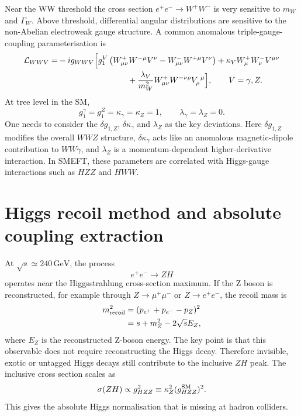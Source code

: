 \documentclass[11pt,a4paper]{report}
\newcommand{\ee}{e^+e^-}
\newcommand{\GeV}{\,\mathrm{GeV}}
\begin{document}
Near the WW threshold the cross section $\ee\to W^+W^-$ is very sensitive to $m_W$ and $\Gamma_W$.  Above threshold, differential angular distributions are sensitive to the non-Abelian electroweak gauge structure.  A common anomalous triple-gauge-coupling parameterisation is
\begin{align}
  \mathcal L_{WWV}=&-i g_{WWV}\Big[
  g_1^V\left(W^+_{\mu\nu}W^{-\mu}V^\nu-W^-_{\mu\nu}W^{+\mu}V^\nu\right)
  +\kappa_V W^+_\mu W^-_\nu V^{\mu\nu} \\
  &\hspace{3.0cm}
  +\frac{\lambda_V}{m_W^2}W^+_{\mu\nu}W^{-\nu\rho}V_{\rho}^{\ \mu}\Big],
  \qquad V=\gamma,Z.
\end{align}
At tree level in the SM,
\begin{equation}
  g_1^\gamma=g_1^Z=\kappa_\gamma=\kappa_Z=1,
  \qquad
  \lambda_\gamma=\lambda_Z=0.
\end{equation}
One needs to consider the $\delta g_{1,Z}$, $\delta\kappa_\gamma$ and $\lambda_Z$ as the key deviations.  Here $\delta g_{1,Z}$ modifies the overall $WWZ$ structure, $\delta\kappa_\gamma$ acts like an anomalous magnetic-dipole contribution to $WW\gamma$, and $\lambda_Z$ is a momentum-dependent higher-derivative interaction.  In SMEFT, these parameters are correlated with Higgs-gauge interactions such as $HZZ$ and $HWW$.


\section{Higgs recoil method and absolute coupling extraction}

At $\sqrt{s}\simeq240\GeV$, the process
\begin{equation}
  \ee\to ZH
\end{equation}
operates near the Higgsstrahlung cross-section maximum.  If the Z boson is reconstructed, for example through $Z\to\mu^+\mu^-$ or $Z\to e^+e^-$, the recoil mass is
\begin{align}
  m_{\rm recoil}^2&=(p_{e^+}+p_{e^-}-p_Z)^2 \\
  &=s+m_Z^2-2\sqrt{s}E_Z,
\end{align}
where $E_Z$ is the reconstructed Z-boson energy.  The key point is that this observable does not require reconstructing the Higgs decay.  Therefore invisible, exotic or untagged Higgs decays still contribute to the inclusive $ZH$ peak.  The inclusive cross section scales as
\begin{equation}
  \sigma(ZH)\propto g_{HZZ}^2\equiv \kappa_Z^2(g_{HZZ}^{\rm SM})^2.
\end{equation}
This gives the absolute Higgs normalisation that is missing at hadron colliders.
\end{document}
